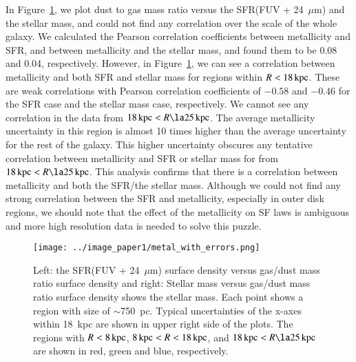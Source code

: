 In Figure~\ref{fig:metal}, we plot dust to gas mass ratio versus the SFR(FUV + 24~$\mu$m) and the stellar mass, and could not find any correlation over the scale of the whole galaxy.
We calculated the Pearson correlation coefficients between metallicity and SFR, and between metallicity and the stellar mass, and found them to be 0.08 and 0.04, respectively. 
However, in Figure~\ref{fig:metal}, we can see a correlation between metallicity and both SFR and stellar mass for regions within $R< 18\,{\rm kpc}$. These are weak correlations with Pearson correlation coefficients of $-0.58$ and $-0.46$ for the SFR case and the stellar mass case, respectively.
We cannot see any correlation in the data from $18\kpc < R \la 25\kpc$. The average metallicity uncertainty in this region is almost 10 times higher than the average uncertainty for the rest of the galaxy. This higher uncertainty obscures any tentative correlation between metallicity and SFR or stellar mass for from $18\kpc < R \la 25\kpc$.   
This analysis confirms that there is a correlation between metallicity and both the SFR/the stellar mass. Although we could not find any strong correlation between the SFR and metallicity, especially in outer disk regions, we should note that the effect of the metallicity on SF laws is ambiguous and more high resolution data is needed to solve this puzzle.

\begin{figure*}
\centering
\texttt{[image: ../image\_paper1/metal\_with\_errors.png]}
    \caption{Left: the SFR(FUV + 24~$\mu$m) surface density versus gas/dust mass ratio surface density and right: Stellar mass versus gas/dust mass ratio surface density  shows the stellar mass. Each point shows a region with size of $\sim$750~pc. Typical uncertainties of the x-axes within 18~kpc are shown in upper right side of the plots. The regions with $R< 8\,{\rm kpc}$, $8\,{\rm kpc} < R < 18\,{\rm kpc}$, and $18\kpc < R \la 25\kpc$ are shown in red, green and blue, respectively.}
    \label{fig:metal}
\end{figure*}

